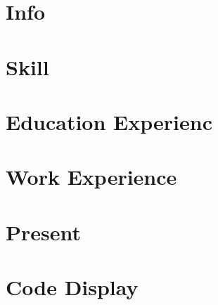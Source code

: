 \documentclass{article}
\begin{document}
	\section*{Info}
		
	\section*{Skill}
		
	\section*{Education Experienc}
		
	\section*{Work Experience}
		
	\section*{Present}
		
	\section*{Code Display}
			
			
		
			
\end{document}
